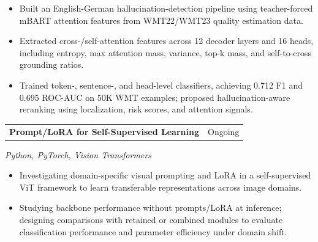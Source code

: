 \documentclass[letterpaper,10pt]{article}
\makeatletter
\newcommand{\entry}[2]{%
  \noindent
  \begin{tabularx}{\linewidth}
    {@{}>{\raggedright\arraybackslash}X@{\hspace{6pt}}r@{}}
    \textbf{#1} & #2
  \end{tabularx}\par
}
\newcommand{\bullets}{
  \begin{itemize}[
    leftmargin=1.2em,
    topsep=2pt,
    itemsep=1pt,
    parsep=0pt,
    partopsep=0pt
  ]
}
\newcommand{\finishbullets}{
  \end{itemize}
}
\makeatother
\begin{document}
\bullets

  \item Built an English-German hallucination-detection pipeline using
  teacher-forced mBART attention features from WMT22/WMT23 quality
  estimation data.

  \item Extracted cross-/self-attention features across 12 decoder
  layers and 16 heads, including entropy, max attention mass,
  variance, top-k mass, and self-to-cross grounding ratios.

  \item Trained token-, sentence-, and head-level classifiers,
  achieving 0.712 F1 and 0.695 ROC-AUC on 50K WMT examples;
  proposed hallucination-aware reranking using localization,
  risk scores, and attention signals.

\finishbullets

\entry
  {Prompt/LoRA for Self-Supervised Learning}
  {Ongoing}

\textit{Python, PyTorch, Vision Transformers}

\bullets

  \item Investigating domain-specific visual prompting and LoRA
  in a self-supervised ViT framework to learn transferable
  representations across image domains.

  \item Studying backbone performance without prompts/LoRA at
  inference; designing comparisons with retained or combined modules
  to evaluate classification performance and parameter efficiency
  under domain shift.

\finishbullets
\end{document}
